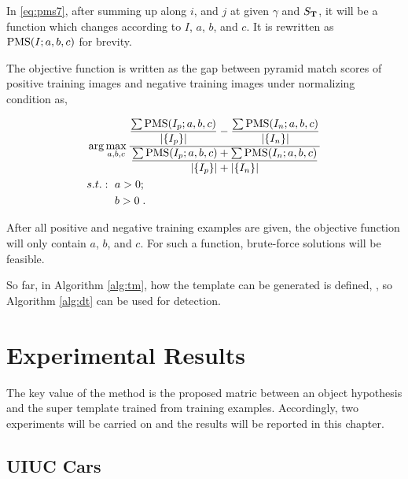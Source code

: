 In \ref{eq:pms7}, after summing up along $i$, and $j$ at given $\gamma$ and $S_{\bf T}$, it will be a function which changes according to $I$, $a$, $b$, and $c$. It is rewritten as ${\rm PMS}(I;a,b,c)$ for  brevity.

The objective function is written as the gap between pyramid match scores of positive training images and negative training images under normalizing condition as,

\[\begin{aligned}
&\arg \max\limits_{a,b,c} \dfrac{ \dfrac {\sum {\rm PMS}(I_p;a,b,c)}  {|\{ I_p \}|} - \dfrac {\sum {\rm PMS}(I_n;a,b,c)}  {|\{ I_n \}|} }
{\dfrac
{{\sum {\rm PMS}(I_p;a,b,c)}+ {\sum {\rm PMS}(I_n;a,b,c) }}
{|\{ I_p \}|+|\{ I_n \}|}
}\\
&\begin{aligned}
    s.t.:\mbox{ }& a>0;\\
    &b>0\;.
\end{aligned}
\end{aligned}
\]

After all positive and negative training examples are given, the objective function will only contain $a$, $b$, and $c$. For such a function, brute-force solutions will be feasible.

So far, in Algorithm \ref{alg:tm}, how the template can be generated is defined,  , so Algorithm \ref{alg:dt} can be used for detection.


\section{Experimental Results}
\label{exp5}
The key value of the method is the proposed matric between an object hypothesis and the super template trained from training examples. Accordingly, two experiments will be carried on and the results will be reported in this chapter.


\subsection{UIUC Cars}

